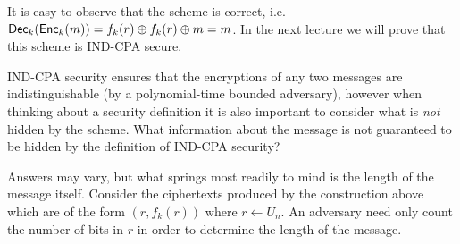 \documentclass[11pt]{article}
\begin{document}
It is easy to observe that the scheme is correct,
i.e. $\mathsf{Dec}_k(\mathsf{Enc}_k (m)) = f_k(r) \oplus f_k(r) \oplus m =
m$. In the next lecture we will prove that this scheme is IND-CPA
secure.

\begin{question}
  IND-CPA security ensures that the encryptions of any two messages
  are indistinguishable (by a polynomial-time bounded adversary),
  however when thinking about a security definition it is also
  important to consider what is \emph{not} hidden by the scheme. What
  information about the message is not guaranteed to be hidden by the
  definition of IND-CPA security?
\end{question}

\begin{answer}
  Answers may vary, but what springs most readily to mind is the
  length of the message itself. Consider the ciphertexts produced by
  the construction above which are of the form \((r, f_k(r))\) where
  \(r \gets U_n\). An adversary need only count the number of bits in
  \(r\) in order to determine the length of the message.
\end{answer}
\end{document}
